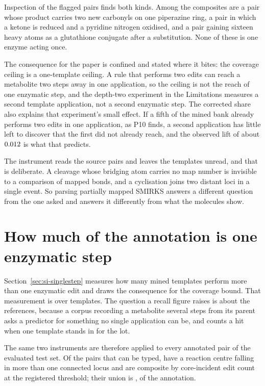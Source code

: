 \documentclass[journal=jcisd8,manuscript=suppinfo,layout=onecolumn]{achemso}
\begin{document}
Inspection of the flagged pairs finds both kinds. Among the composites are a pair whose product
carries two new carbonyls on one piperazine ring, a pair in which a ketone is reduced and a
pyridine nitrogen oxidised, and a pair gaining sixteen heavy atoms as a glutathione conjugate
after a substitution. None of these is one enzyme acting once.

The consequence for the paper is confined and stated where it bites: the coverage ceiling is a
one-template ceiling. A rule that performs two edits can reach a metabolite two steps away in one
application, so the ceiling is not the reach of one enzymatic step, and the depth-two experiment
in the Limitations measures a second template application, not a second enzymatic step. The
corrected share also explains that experiment's small effect. If a fifth of the mined bank
already performs two edits in one application, as P10 finds, a second application has little left
to discover that the first did not already reach, and the observed lift of about $0.012$ is what
that predicts.

The instrument reads the source pairs and leaves the templates unread, and that is deliberate. A
cleavage whose bridging atom carries no map number is invisible to a comparison of mapped bonds, and
a cyclisation joins two distant loci in a single event. So parsing partially mapped SMIRKS answers a
different question from the one asked and answers it differently from what the molecules show.

\section{How much of the annotation is one enzymatic step}
\label{sec:si-refstep}

Section~\ref{sec:si-singlestep} measures how many mined templates perform more than one enzymatic
edit and draws the consequence for the coverage bound. That measurement is over templates. The
question a recall figure raises is about the references, because a corpus recording a
metabolite several steps from its parent asks a predictor for something no single application can
be, and counts a hit when one template stands in for the lot.

The same two instruments are therefore applied to every annotated pair of the evaluated test set.
Of the \numRefstepTyped{} pairs that can be typed, \numRefstepLoci{} have a reaction centre falling
in more than one connected locus and \numRefstepEdits{} are composite by core-incident edit count
at the registered threshold; their union is \numRefstepEither{},
\numRefstepEithersharePct{} of the annotation.
\end{document}
